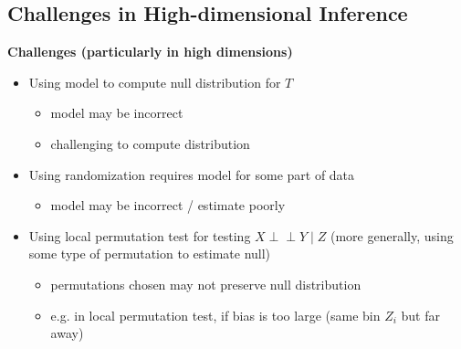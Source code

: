 \subsection{Challenges in High-dimensional Inference}


\textbf{Challenges (particularly in high dimensions)}
\begin{itemize}
    \item Using model to compute null distribution for $T$
    \begin{itemize}
        \item[$\hookrightarrow$] model may be incorrect
        \item[$\hookrightarrow$] challenging to compute distribution
    \end{itemize}
    \item Using randomization requires model for some part of data
    \begin{itemize}
        \item[$\hookrightarrow$] model may be incorrect / estimate poorly
    \end{itemize}
    \item Using local permutation test for testing $X \perp \!\! \perp Y \mid Z$ (more generally, using some type of permutation to estimate null)
    \begin{itemize}
        \item[$\hookrightarrow$] permutations chosen may not preserve null distribution
        \item e.g. in local permutation test, if bias is too large (same bin $Z_i$ but far away)
    \end{itemize}
\end{itemize}

